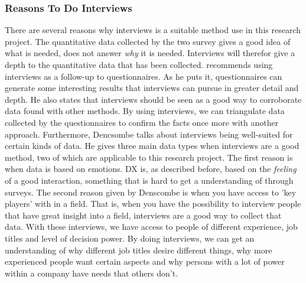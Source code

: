 \documentclass{article}
\begin{document}
\subsubsection{Reasons To Do Interviews}
There are several reasons why interviews is a suitable method use in this research project.
The quantitative data collected
by the two survey gives a good idea of what is needed, does not answer \textit{why} it is needed.
Interviews will therefor give a depth to the quantitative data that has been collected.
\cite{denscombe} recommends using interviews as a follow-up to questionnaires. As he puts it,
questionnaires can generate some interesting results that interviews can pursue
in greater detail and depth. He also states that interviews should be seen as a good way
to corroborate data found with other methods. By using interviews, we can triangulate data
collected by the questionnaires to confirm the facts once more with another approach.
Furthermore, Dencsombe talks about interviews being well-suited for certain kinds of data.
He gives three main data types when interviews are a good method,
two of which are applicable to this research project. The first reason is
when data is based on emotions. DX is, as described before, based on the \textit{feeling}
of a good interaction, something that is hard to get a understanding of through
surveys. The second reason given by Denscombe is when you have access to 'key players'
with in a field. That is, when you have the possibility to interview people
that have great insight into a field, interviews are a good way to collect that data.
With these interviews, we have access to people of different experience, job titles
and level of decision power. By doing interviews, we can get an understanding
of why different job titles desire different things, why more experienced people
want certain aspects and why persons with a lot of power within a company
have needs that others don't.
\end{document}
